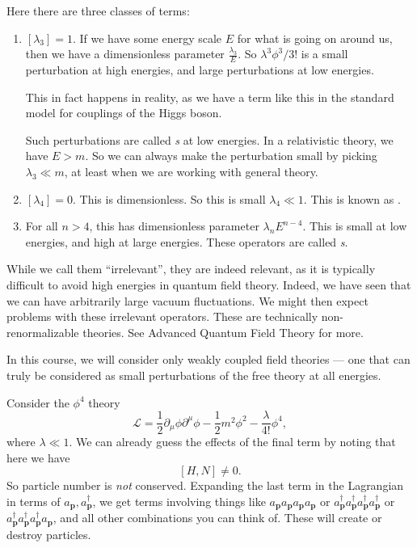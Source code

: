 \documentclass[a4paper]{article}
\begin{document}
Here there are three classes of terms:
\begin{enumerate}
  \item $[\lambda_3] = 1$. If we have some energy scale $E$ for what is going on around us, then we have a dimensionless parameter $\frac{\lambda_3}{E}$. So $\lambda^3 \phi^3/3!$ is a small perturbation at high energies, and large perturbations at low energies.

    This in fact happens in reality, as we have a term like this in the standard model for couplings of the Higgs boson.

    Such perturbations are called \emph{s} at low energies. In a relativistic theory, we have $E > m$. So we can always make the perturbation small by picking $\lambda_3 \ll m$, at least when we are working with general theory.

  \item $[\lambda_4] = 0$. This is dimensionless. So this is small $\lambda_4 \ll 1$. This is known as .

  \item For all $n > 4$, this has dimensionless parameter $\lambda_n E^{n - 4}$. This is small at low energies, and high at large energies. These operators are called \emph{s}.
\end{enumerate}
While we call them ``irrelevant'', they are indeed relevant, as it is typically difficult to avoid high energies in quantum field theory. Indeed, we have seen that we can have arbitrarily large vacuum fluctuations. We might then expect problems with these irrelevant operators. These are technically non-renormalizable theories. See Advanced Quantum Field Theory for more.

In this course, we will consider only weakly coupled field theories --- one that can truly be considered as small perturbations of the free theory at all energies.

\begin{eg}
  Consider the $\phi^4$ theory
  \[
    \mathcal{L} = \frac{1}{2} \partial_\mu \phi \partial^\mu \phi - \frac{1}{2}m^2 \phi^2 - \frac{\lambda}{4!}\phi^4,
  \]
  where $\lambda \ll 1$. We can already guess the effects of the final term by noting that here we have
  \[
    [H, N] \not= 0.
  \]
  So particle number is \emph{not} conserved. Expanding the last term in the Lagrangian in terms of $a_\mathbf{p}, a_\mathbf{p}^\dagger$, we get terms involving things like $a_\mathbf{p} a_\mathbf{p} a_\mathbf{p} a_\mathbf{p}$ or $a_\mathbf{p}^\dagger a_\mathbf{p}^\dagger a_\mathbf{p}^\dagger a_\mathbf{p}^\dagger$ or $a_\mathbf{p}^\dagger a_\mathbf{p}^\dagger a_\mathbf{p}^\dagger a_\mathbf{p}$, and all other combinations you can think of. These will create or destroy particles.
\end{eg}
\end{document}
